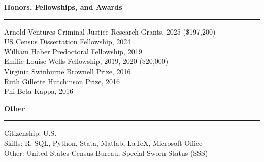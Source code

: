 \documentclass[12pt,letterpaper]{article}
\newcommand{\cvheading}[1]{%
    \par\vspace{0.5cm}
    {\Large \textbf{#1}}
    \vspace{0.1cm}
    \hrule
    \vspace{0.2cm}
}
\begin{document}
\cvheading{Honors, Fellowships, and Awards}
Arnold Ventures Criminal Justice Research Grants, 2025 (\$197{,}200)
\\[0.1cm]
US Census Dissertation Fellowship, 2024
\\[0.1cm]
William Haber Predoctoral Fellowship, 2019
\\[0.1cm]
Emilie Louise Wells Fellowship, 2019, 2020 (\$20{,}000)
\\[0.1cm]
Virginia Swinburne Brownell Prize, 2016
\\[0.1cm]
Ruth Gillette Hutchinson Prize, 2016
\\[0.1cm]
Phi Beta Kappa, 2016
\cvheading{Other}
Citizenship: U.S.
\\[0.1cm]
Skills: R, SQL, Python, Stata, Matlab, \LaTeX, Microsoft Office
\\[0.1cm]
Other: United States Census Bureau, Special Sworn Status (SSS)
\end{document}

